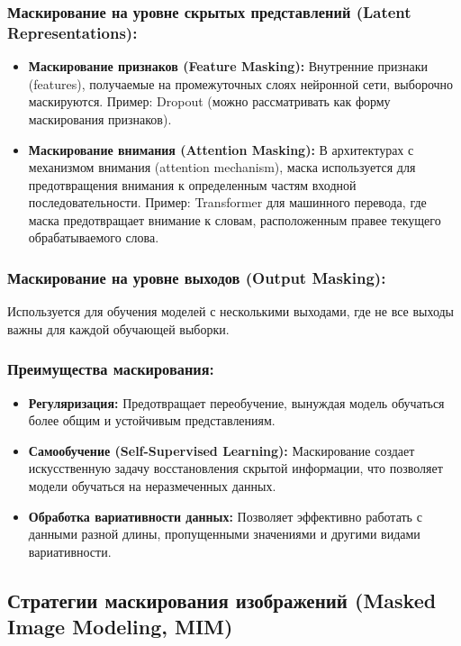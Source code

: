 \subsubsection{Маскирование на уровне скрытых представлений (Latent Representations):}

\begin{itemize}
    \item \textbf{Маскирование признаков (Feature Masking):} Внутренние признаки (features), получаемые на промежуточных слоях нейронной сети, выборочно маскируются.
    Пример: Dropout (можно рассматривать как форму маскирования признаков).
    \item \textbf{Маскирование внимания (Attention Masking):} В архитектурах с механизмом внимания (attention mechanism), маска используется для предотвращения внимания к определенным частям входной последовательности. 
    Пример: Transformer для машинного перевода, где маска предотвращает внимание к словам, расположенным правее текущего обрабатываемого слова.
\end{itemize}

\subsubsection{Маскирование на уровне выходов (Output Masking):}
Используется для обучения моделей с несколькими выходами, где не все выходы важны для каждой обучающей выборки.


\subsubsection{Преимущества маскирования:}

\begin{itemize}
    \item \textbf{Регуляризация:} Предотвращает переобучение, вынуждая модель обучаться более общим и устойчивым представлениям.
    \item \textbf{Самообучение (Self-Supervised Learning):} Маскирование создает искусственную задачу восстановления скрытой информации, что позволяет модели обучаться на неразмеченных данных.
    \item \textbf{Обработка вариативности данных:} Позволяет эффективно работать с данными разной длины, пропущенными значениями и другими видами вариативности.
\end{itemize}

\subsection{Стратегии маскирования изображений (Masked Image Modeling, MIM)}

